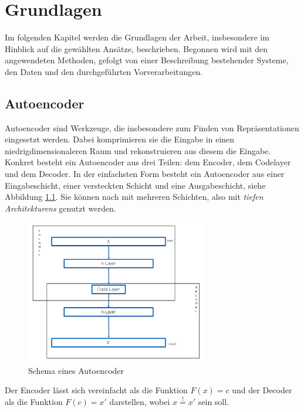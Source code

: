 \chapter{Grundlagen}
\label{chap:Grundlagen}
Im folgenden Kapitel werden die Grundlagen der Arbeit, insbesondere im Hinblick auf die gewählten Ansätze, beschrieben. Begonnen wird mit den angewendeten Methoden, gefolgt von einer Beschreibung bestehender Systeme, den Daten und den durchgeführten Vorverarbeitungen.

	\section{Autoencoder}
	\label{sec:ConvolutionalAutoencoder}		
	Autoencoder \cite{D.E.Rumelhart.1987} sind Werkzeuge, die insbesondere zum Finden von Repräsentationen eingesetzt werden. Dabei komprimieren sie die Eingabe in einen niedrigdimensionaleren Raum und rekonstruieren aus diesem die Eingabe. Konkret besteht ein Autoencoder aus drei Teilen: dem Encoder, dem Codelayer und dem Decoder. In der einfachsten Form besteht ein Autoencoder aus einer Eingabeschicht, einer versteckten Schicht und eine Ausgabeschicht, siehe Abbildung \ref{img:SchemaCAE}. Sie können nach \cite{Hinton.2006} mit mehreren Schichten, also mit \textit{tiefen Architekturens} genutzt werden. 
	\begin{figure}[h]
		\centering
		\includegraphics[width=0.7\textwidth, center]{bilder/Schema_Autoencoders/Schema_CAE2.png}
		\caption[Schema Autoencoder]{Schema eines Autoencoder}
		\label{img:SchemaCAE}
	\end{figure} 

	Der Encoder lässt sich vereinfacht als die Funktion $F(x)=c$ und der Decoder als die Funktion $ F(c)=x'$ darstellen, wobei $x\stackrel{!}{=}x'$ sein soll.
	 

